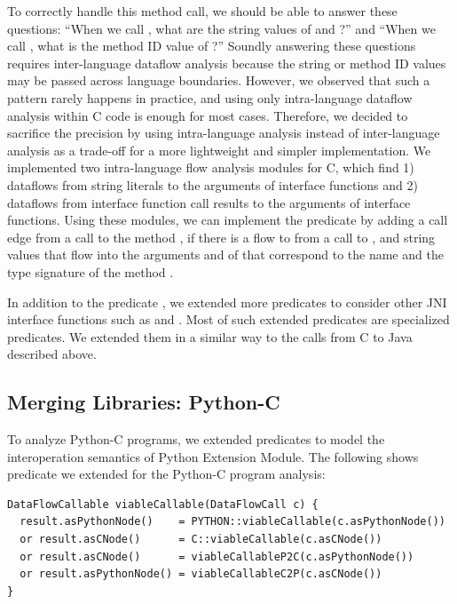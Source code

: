 To correctly handle this method call, we should be able to answer these
questions: ``When we call , what are the string values of
 and ?'' and ``When we call ,
what is the method ID value of ?'' Soundly answering these questions
requires inter-language dataflow analysis because the string or method ID
values may be passed across language boundaries.  However, we observed that
such a pattern rarely happens in practice, and using only intra-language
dataflow analysis within C code is enough for most cases.  Therefore, we
decided to sacrifice the precision by using intra-language analysis instead of
inter-language analysis as a trade-off for a more lightweight and simpler
implementation.  We implemented two intra-language flow analysis modules for C,
which find 1) dataflows from string literals to the arguments of interface
functions and 2) dataflows from interface function call results to the
arguments of interface functions.  Using these modules, we can implement the
predicate  by adding a call edge from a
 call to the method , if there is a flow to
 from a call to , and string values that flow
into the arguments  and  of  that
correspond to the name and the type signature of the method .

In addition to the predicate , we extended more
predicates to consider other JNI interface functions such as 
and .  Most of such extended predicates are specialized
 predicates.  We extended them in a similar way to the calls from
C to Java described above.

\subsection{Merging Libraries: Python-C}\label{sec:merging2}
To analyze Python-C programs, we extended predicates to model the
interoperation semantics of Python Extension Module.  The following shows
 predicate we extended for the Python-C program
analysis:

\begin{lstlisting}[style=codeql,xleftmargin=-.5em,numbers=none]
DataFlowCallable viableCallable(DataFlowCall c) {
  result.asPythonNode()    = PYTHON::viableCallable(c.asPythonNode())
  or result.asCNode()      = C::viableCallable(c.asCNode())
  or result.asCNode()      = viableCallableP2C(c.asPythonNode())
  or result.asPythonNode() = viableCallableC2P(c.asCNode())
}
\end{lstlisting}

